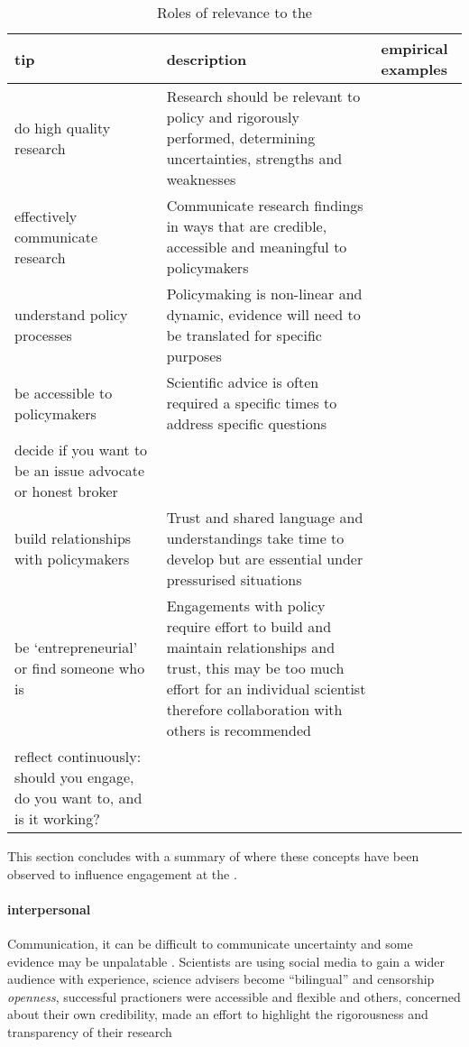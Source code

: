 \begin{table}[!ht]
\footnotesize
\caption{Roles of relevance to the \SPI}\label{tab:litstrategies}
\begin{tabular}{L{.22\linewidth}L{.56\linewidth}L{.22\linewidth}} 
\textbf{tip} & \textbf{description} & \textbf{empirical examples} \\ \hline
do high quality research	 & 	Research should be relevant to policy and rigorously performed, determining uncertainties, strengths and weaknesses 	 & 	\textcite{RoseBOP2018,OjanenBKP2021}  \\[5mm]
effectively communicate research	 & 	Communicate research findings in ways that are credible, accessible and meaningful to policymakers	 & 	\textcite{RoseBOP2018,Obermeister2022} \\[5mm]
understand policy processes	 & 	Policymaking is non-linear and dynamic, evidence will need to be translated for specific purposes	 & 	\textcite{Obermeister2022} \\[5mm]
be accessible to policymakers	 & 	Scientific advice is often required a specific times to address specific questions	 & 	\textcite{GogginEtAl2015} \\[5mm]
decide if you want to be an issue advocate or honest broker	 & 		 & 	 \\[5mm]
build relationships with policymakers	 & 	Trust and shared language and understandings take time to develop but are essential under pressurised situations	 & 	\textcite{OjanenBKP2021} \\[5mm]
be `entrepreneurial' or find someone who is	 & 	Engagements with policy require effort to build and maintain relationships and trust, this may be too much effort for an individual  scientist therefore collaboration with others is recommended	 & 	\textcite{RoseBOP2018} \\[5mm]
reflect continuously: should you engage, do you want to, and is it working?	 & 		 & 	\textcite{OjanenBKP2021,Obermeister2022} \\[5mm]
\hline
\end{tabular}
\end{table}


This section concludes with a summary of where these concepts have been observed to influence engagement at the \SPI. 

\paragraph{interpersonal}
Communication, it can be difficult to communicate uncertainty \cite{IbarraJOBCIMRS2022} and some evidence may be unpalatable  \cite{OjanenBKP2021}. Scientists are using social media to gain a wider audience \cite{LubchencoR2020,ThompsonD2024} with experience, science advisers become ``bilingual'' \cite{Obermeister2022} and 
censorship
\emph{openness}, successful practioners were accessible and flexible \cite{GogginEtAl2015} and others, concerned about their own credibility, made an effort to highlight the rigorousness and  transparency of their research \cite{OjanenBKP2021}

